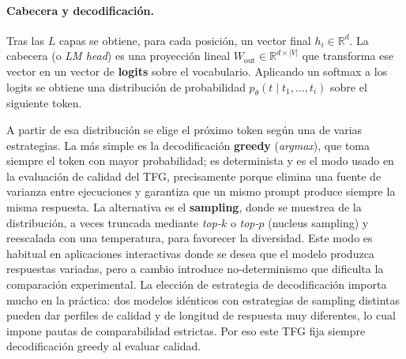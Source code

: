\documentclass[11pt,a4paper]{article}
\begin{document}
\paragraph{Cabecera y decodificación.} Tras las $L$ capas se obtiene, para cada posición, un vector final $h_i \in \mathbb{R}^{d}$. La cabecera (o \textit{LM head}) es una proyección lineal $W_{\text{out}} \in \mathbb{R}^{d \times |V|}$ que transforma ese vector en un vector de \textbf{logits} sobre el vocabulario. Aplicando un softmax a los logits se obtiene una distribución de probabilidad $p_\theta(t \mid t_1, \dots, t_i)$ sobre el siguiente token.

A partir de esa distribución se elige el próximo token según una de varias estrategias. La más simple es la decodificación \textbf{greedy} (\textit{argmax}), que toma siempre el token con mayor probabilidad; es determinista y es el modo usado en la evaluación de calidad del TFG, precisamente porque elimina una fuente de varianza entre ejecuciones y garantiza que un mismo prompt produce siempre la misma respuesta. La alternativa es el \textbf{sampling}, donde se muestrea de la distribución, a veces truncada mediante \textit{top-$k$} o \textit{top-$p$} (nucleus sampling) y reescalada con una temperatura, para favorecer la diversidad. Este modo es habitual en aplicaciones interactivas donde se desea que el modelo produzca respuestas variadas, pero a cambio introduce no-determinismo que dificulta la comparación experimental. La elección de estrategia de decodificación importa mucho en la práctica: dos modelos idénticos con estrategias de sampling distintas pueden dar perfiles de calidad y de longitud de respuesta muy diferentes, lo cual impone pautas de comparabilidad estrictas. Por eso este TFG fija siempre decodificación greedy al evaluar calidad.
\end{document}
